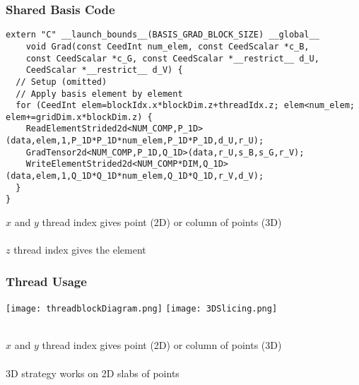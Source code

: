 \documentclass{beamer}
\begin{document}
\begin{frame}[fragile]
\begin{center}
\frametitle{Shared Basis Code}

{\tiny
\begin{lstlisting}[style=boxedC]
extern "C" __launch_bounds__(BASIS_GRAD_BLOCK_SIZE) __global__
    void Grad(const CeedInt num_elem, const CeedScalar *c_B,
    const CeedScalar *c_G, const CeedScalar *__restrict__ d_U,
    CeedScalar *__restrict__ d_V) {
  // Setup (omitted)
  // Apply basis element by element
  for (CeedInt elem=blockIdx.x*blockDim.z+threadIdx.z; elem<num_elem; elem+=gridDim.x*blockDim.z) {
    ReadElementStrided2d<NUM_COMP,P_1D>(data,elem,1,P_1D*P_1D*num_elem,P_1D*P_1D,d_U,r_U);
    GradTensor2d<NUM_COMP,P_1D,Q_1D>(data,r_U,s_B,s_G,r_V);
    WriteElementStrided2d<NUM_COMP*DIM,Q_1D>(data,elem,1,Q_1D*Q_1D*num_elem,Q_1D*Q_1D,r_V,d_V);
  }
}
\end{lstlisting}
}

$x$ and $y$ thread index gives point (2D) or column of points (3D)\\

~\\

$z$ thread index gives the element\\

\end{center}
\end{frame}


\begin{frame}
\begin{center}
\frametitle{Thread Usage}

\texttt{[image: threadblockDiagram.png]}
\texttt{[image: 3DSlicing.png]}

~\\

$x$ and $y$ thread index gives point (2D) or column of points (3D)\\

~\\

3D strategy works on 2D slabs of points\\

\end{center}
\end{frame}

\end{document}
